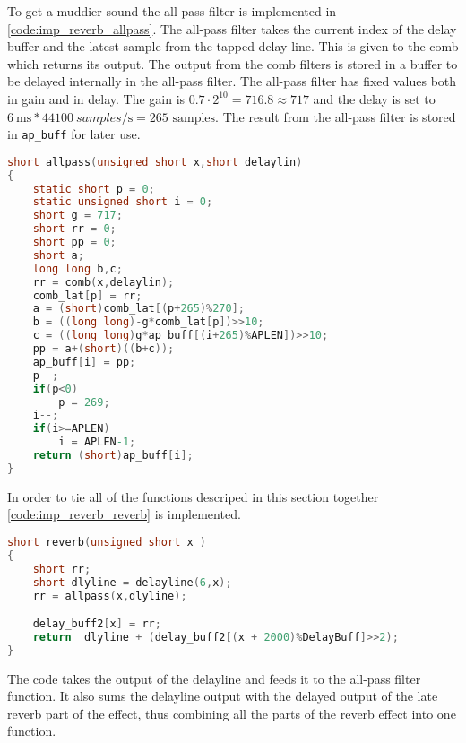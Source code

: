 To get a muddier sound the all-pass filter is implemented in \autoref{code:imp_reverb_allpass}. The all-pass filter takes the current index of the delay buffer and the latest sample from the tapped delay line. This is given to the comb which returns its output. The output from the comb filters is stored in a buffer to be delayed internally in the all-pass filter. The all-pass filter has fixed values both in gain and in delay. The gain is $0.7 \cdot 2^{10}=716.8\approx 717$ and the delay is set to $\SI{6}{\milli \second} * \SI{44100}{samples \per \second} = 265 \text{ samples}$. The result from the all-pass filter is stored in \texttt{ap_buff} for later use. 

\begin{lstlisting}[caption={Implementation of all-pass filter.},language=C,label={code:imp_reverb_allpass},tabsize=2]
short allpass(unsigned short x,short delaylin)
{
	static short p = 0;
	static unsigned short i = 0;
	short g = 717;
	short rr = 0;
	short pp = 0;
	short a;
	long long b,c;
	rr = comb(x,delaylin);
	comb_lat[p] = rr;
	a = (short)comb_lat[(p+265)%270];
	b = ((long long)-g*comb_lat[p])>>10;
	c = ((long long)g*ap_buff[(i+265)%APLEN])>>10;
	pp = a+(short)((b+c));
	ap_buff[i] = pp;
	p--;
	if(p<0)
		p = 269;
	i--;
	if(i>=APLEN)
		i = APLEN-1;
	return (short)ap_buff[i];
}
\end{lstlisting}

In order to tie all of the functions descriped in this section together \autoref{code:imp_reverb_reverb} is implemented.

\begin{lstlisting}[caption={Function combining the reverb functions.},language=C,label={code:imp_reverb_reverb},tabsize=2]
short reverb(unsigned short x )
{
	short rr;
	short dlyline = delayline(6,x);
	rr = allpass(x,dlyline);

	delay_buff2[x] = rr;
	return  dlyline + (delay_buff2[(x + 2000)%DelayBuff]>>2);
}
\end{lstlisting}

The code takes the output of the delayline and feeds it to the all-pass filter function. It also sums the delayline output with the delayed output of the late reverb part of the effect, thus combining all the parts of the reverb effect into one function.